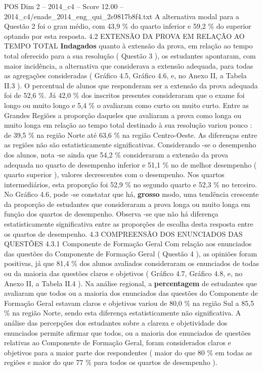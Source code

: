 \begin{textsample}{POS Dim 2 – 2014\_c4 – Score 12.00 – 2014\_c4/enade\_2014\_eng\_qui\_2e9817b8f4.txt}
A alternativa modal para a Questão 2 foi o grau médio, com 43,9 \% do quarto inferior e 59,2 \% do superior optando por esta resposta. 4.2 EXTENSÃO DA PROVA EM RELAÇÃO AO TEMPO TOTAL \textbf{Indagados} quanto à extensão da prova, em relação ao tempo total oferecido para a sua resolução ( Questão 3 ), os estudantes apontaram, com maior incidência, a alternativa que considerava a extensão adequada, para todas as agregações consideradas ( Gráfico 4.5, Gráfico 4.6, e, no Anexo II, a Tabela II.3 ).
O percentual de alunos que responderam ser a extensão da prova adequada foi de 52,6 \%.
Já 42,0 \% dos inscritos presentes consideraram que o exame foi longo ou muito longo e 5,4 \% o avaliaram como curto ou muito curto.
Entre as Grandes Regiões a proporção daqueles que avaliaram a prova como longa ou muito longa em relação ao tempo total destinado à sua resolução variou pouco : de 39,5 \% na região Norte até 63,6 \% na região Centro-Oeste.
As diferenças entre as regiões não são estatisticamente significativas.
Considerando -se o desempenho dos alunos, nota -se ainda que 54,2 \% consideraram a extensão da prova adequada no quarto de desempenho inferior e 51,1 \% no de melhor desempenho ( quarto superior ), valores decrescentes com o desempenho.
Nos quartos intermediários, esta proporção foi 52,9 \% no segundo quarto e 52,3 \% no terceiro.
No Gráfico 4.6, pode -se constatar que há, \textbf{grosso} modo, uma tendência crescente da proporção de estudantes que consideraram a prova longa ou muito longa em função dos quartos de desempenho.
Observa -se que não há diferença estatisticamente significativa entre as proporções de escolha desta resposta entre os quartos de desempenho. 4.3 COMPREENSÃO DOS ENUNCIADOS DAS QUESTÕES 4.3.1 Componente de Formação Geral Com relação aos enunciados das questões do Componente de Formação Geral ( Questão 4 ), as opiniões foram positivas, já que 81,4 \% dos alunos avaliados consideraram os enunciados de todas ou da maioria das questões claros e objetivos ( Gráfico 4.7, Gráfico 4.8, e, no Anexo II, a Tabela II.4 ).
Na análise regional, a \textbf{percentagem} de estudantes que avaliaram que todos ou a maioria dos enunciados das questões do Componente de Formação Geral estavam claros e objetivos variou de 80,0 \% na região Sul a 85,5 \% na região Norte, sendo esta diferença estatisticamente não significativa.
A análise das percepções dos estudantes sobre a clareza e objetividade dos enunciados permite afirmar que todos, ou a maioria dos enunciados de questões relativas ao Componente de Formação Geral, foram considerados claros e objetivos para a maior parte dos respondentes ( maior do que 80 \% em todas as regiões e maior do que 77 \% para todos os quartos de desempenho ).

\end{textsample}
